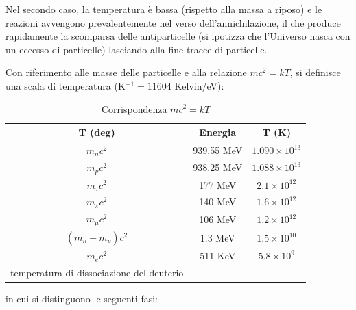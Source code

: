 Nel secondo caso, la temperatura è bassa (rispetto alla massa a riposo) e le
reazioni avvengono prevalentemente nel verso dell'annichilazione, il che produce
rapidamente la scomparsa delle antiparticelle (si ipotizza che l'Universo nasca
con un eccesso di particelle) lasciando alla fine tracce di particelle.


Con riferimento alle masse delle particelle e alla relazione $m c^2 = kT$, si
definisce una scala di temperatura (K$^{-1} = 11604$ Kelvin/eV):
\begin{table}
  \centering{}
  \caption{Corrispondenza $m c^2 = kT$}
  \label{massa_temp}
  \begin{tabular}{ccc}
    \toprule
    T (deg)         & Energia    & T (K)              \\
    \midrule
    $m_n c^2$       & 939.55 MeV & $1.090 \times 10^{13}$ \\
    $m_p c^2 $      & 938.25 MeV & $1.088 \times 10^{13}$ \\
    $m_{\tau}c^2$   & 177    MeV & $2.1   \times 10^{12}$ \\
    $m_{\pi} c^2$   & 140    MeV & $1.6   \times 10^{12}$ \\
    $m_{\mu} c^2 $  & 106    MeV & $1.2   \times 10^{12}$ \\
    $(m_n-m_p) c^2$ & 1.3    MeV & $1.5   \times 10^{10}$ \\
    $m_e c^2      $ & 511    KeV & $5.8   \times 10^{9 }$ \\
    temperatura di dissociazione del deuterio \\
    \bottomrule
  \end{tabular}
\end{table}
in cui si distinguono le seguenti fasi:
